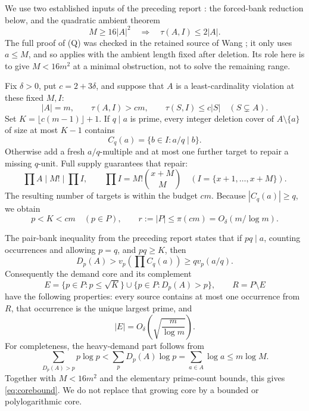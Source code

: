 \documentclass[11pt,a4paper]{article}
\theoremstyle{remark}
\begin{document}
We use two established inputs of the preceding report \cite{Previous}:
the forced-bank reduction below, and the quadratic ambient theorem
\[
 M\ge16|A|^2\quad\Longrightarrow\quad \tau(A,I)\le2|A|.
 \tag{Q}
\]
The full proof of (Q) was checked in the retained source of Wang
\cite{Wang}; it only uses \(a\le M\), and so applies with the ambient
length fixed after deletion. Its role here is to give
\(M<16m^2\) at a minimal obstruction, not to solve the remaining range.

Fix \(\delta>0\), put \(c=2+3\delta\), and suppose that \(A\) is a
least-cardinality violation at these fixed \(M,I\):
\begin{equation}
 |A|=m,\qquad \tau(A,I)>cm,\qquad
 \tau(S,I)\le c|S|\quad(S\subsetneq A).
 \label{eq:minimal}
\end{equation}
Set \(K=\lfloor c(m-1)\rfloor+1\). If \(q\mid a\) is prime, every
integer deletion cover of \(A\setminus\{a\}\) of size at most \(K-1\)
contains
\[
 C_q(a)=\{b\in I:a/q\mid b\}.
\]
Otherwise add a fresh \(a/q\)-multiple and at most one further target
to repair a missing \(q\)-unit. Full supply guarantees that repair:
\begin{equation}
 \prod A\mid M!\mid\prod I,\qquad
 \prod I=M!\binom{x+M}{M}\quad(I=\{x+1,\ldots,x+M\}).
 \label{eq:supply}
\end{equation}
The resulting number of targets is within the budget \(cm\).
Because \(|C_q(a)|\ge q\), we obtain
\begin{equation}
 p<K<cm\quad(p\in P),\qquad
 r:=|P|\le\pi(cm)=O_\delta(m/\log m).
 \label{eq:primecap}
\end{equation}

The pair-bank inequality from the preceding report states that if
\(pq\mid a\), counting occurrences and allowing \(p=q\), and
\(pq\ge K\), then
\[
 D_p(A)>v_p\!\left(\prod C_q(a)\right)\ge qv_p(a/q).
\]
Consequently the demand core and its complement
\begin{equation}
 E=\{p\in P:p\le\sqrt K\}\cup\{p\in P:D_p(A)>p\},
 \qquad R=P\setminus E
 \label{eq:core}
\end{equation}
have the following properties: every source contains at most one
occurrence from \(R\), that occurrence is the unique largest prime,
and
\begin{equation}
 |E|=O_\delta\!\left(\sqrt{\frac m{\log m}}\right).
 \label{eq:corebound}
\end{equation}
For completeness, the heavy-demand part follows from
\[
 \sum_{D_p(A)>p}p\log p
 <\sum_pD_p(A)\log p
 =\sum_{a\in A}\log a\le m\log M.
\]
Together with \(M<16m^2\) and the elementary prime-count bounds, this
gives \eqref{eq:corebound}. We do not replace that growing core by a
bounded or polylogarithmic core.
\end{document}
